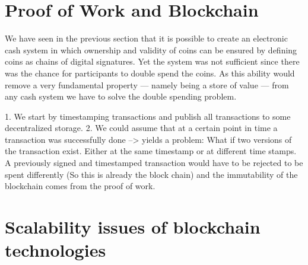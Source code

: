 \documentclass[a4paper,12pt,oneside,openany]{book}
\begin{document}
\section{Proof of Work and Blockchain}
We have seen in the previous section that it is possible to create an electronic cash system in which ownership and validity of coins can be ensured by defining coins as chains of digital signatures.
Yet the system was not sufficient since there was the chance for participants to double spend the coins.
As this ability would remove a very fundamental property --- namely being a store of value ---  from any cash system we have to solve the double spending problem.


1. We start by timestamping transactions and publish all transactions to some decentralized storage.
2. We could assume that at a certain point in time a transaction was successfully done
--> yields a problem: What if two versions of the transaction exist. Either at the same timestamp or at different time stamps. A previously signed and timestamped transaction would have to be rejected to be spent differently
(So this is already the block chain)
and the immutability of the blockchain comes from the proof of work.




\section{Scalability issues of blockchain technologies}
\end{document}
